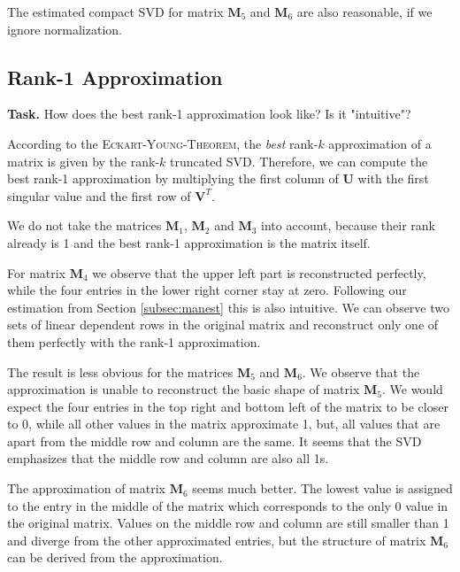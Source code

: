 \documentclass{support/acm_proc_article-sp}
\begin{document}
    The estimated compact SVD for matrix $\mathbf{M}_5$ and $\mathbf{M}_6$ are also reasonable, if we ignore
    normalization.


    \subsection{Rank-1 Approximation}

    \textbf{Task.} How does the best rank-1 approximation look like?
    Is it "intuitive"?

    According to the \textsc{Eckart-Young-Theorem}, the \emph{best} rank-$k$ approximation of a matrix is given by
    the rank-$k$ truncated SVD\@.
    Therefore, we can compute the best rank-1 approximation by multiplying the first column of $\mathbf{U}$ with the
    first singular value and the first row of $\mathbf{V}^T$.

    We do not take the matrices $\mathbf{M}_{1}$, $\mathbf{M}_{2}$ and $\mathbf{M}_{3}$ into account, because their rank
    already is 1 and the best rank-1 approximation is the matrix itself.

    For matrix $\mathbf{M}_{4}$ we observe that the upper left part is reconstructed perfectly, while the four entries
    in the lower right corner stay at zero.
    Following our estimation from Section \ref{subsec:manest} this is also intuitive.
    We can observe two sets of linear dependent rows in the original matrix and reconstruct only one of them perfectly
    with the rank-1 approximation.

    The result is less obvious for the matrices $\mathbf{M}_{5}$ and $\mathbf{M}_{6}$.
    We observe that the approximation is unable to reconstruct the basic shape of matrix $\mathbf{M}_{5}$.
    We would expect the four entries in the top right and bottom left of the matrix to be closer to 0, while all
    other values in the matrix approximate 1, but, all values that are apart from the middle row and column are the same.
    It seems that the SVD emphasizes that the middle row and column are also all 1s.

    The approximation of matrix $\mathbf{M}_{6}$ seems much better.
    The lowest value is assigned to the entry in the middle of the matrix which corresponds to the only 0 value in the
    original matrix.
    Values on the middle row and column are still smaller than 1 and diverge from the other approximated entries, but
    the structure of matrix $\mathbf{M}_{6}$ can be derived from the approximation.
\end{document}
